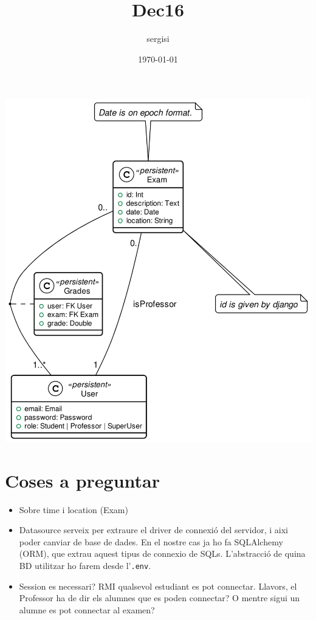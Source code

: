 \documentclass[11pt]{article}
\author{sergisi}
\date{\today}
\title{Dec16}
\begin{document}
\maketitle
\tableofcontents

\begin{center}
\includegraphics[width=.9\linewidth]{img/message_passing.png}
\end{center}

\section{Coses a preguntar}
\label{sec:orgb967974}
\begin{itemize}
\item Sobre time i location (Exam)
\item Datasource serveix per extraure el driver de connexió del servidor, i
aixi poder canviar de base de dades. En el nostre cas ja ho fa SQLAlchemy
(ORM), que extrau aquest tipus de connexio de SQLs. L'abstracció de quina
BD utilitzar ho farem desde l'\texttt{.env}.
\item Session es necessari? RMI qualsevol estudiant es pot connectar. Llavors,
el Professor ha de dir els alumnes que es poden connectar? O mentre sigui
un alumne es pot connectar al examen?
\end{itemize}
\end{document}

